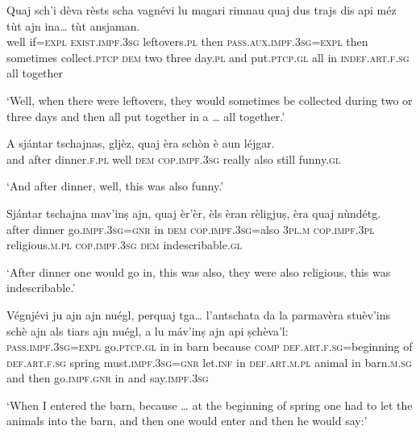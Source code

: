 \begin{linenumbers}
\gll  Quaj sch’i dèva rèsts scha vagnévi lu magari rimnau quaj dus trajs dis api méz tùt ajn ina… tùt ansjaman.  \\
well if=\textsc{expl} \textsc{exist.impf.3sg} leftovers.\textsc{pl} then \textsc{pass.aux.impf.3sg=expl} then sometimes   collect.\textsc{ptcp} \textsc{dem} two three day.\textsc{pl} and put.\textsc{ptcp.gl} all in  \textsc{indef.art.f.sg} all together  \\
\end{linenumbers} 
\medskip
\glt `Well, when there were leftovers, they would sometimes be collected during two or three days and then all put together in a … all together.'
\medskip

\begin{linenumbers}
\gll A sjántar tschajnas, gljèz, quaj èra schòn è aun léjgar.   \\
and after dinner.\textsc{f.pl} well  \textsc{dem} \textsc{cop.impf.3sg} really also still funny.\textsc{gl}  \\
\end{linenumbers}
\medskip
\glt `And after dinner, well, this was also funny.'
\medskip

\begin{linenumbers}
\gll  Sjántar tschajna mav’inṣ ajn, quaj èr’èr, èls èran rèligjuṣ, èra quaj nùndétg.  \\
after dinner go.\textsc{impf.3sg=gnr} in \textsc{dem} \textsc{cop.impf.3sg=}also \textsc{3pl.m} \textsc{cop.impf.3pl} religious.\textsc{m.pl} \textsc{cop.impf.3sg} \textsc{dem} indescribable.\textsc{gl}  \\
\end{linenumbers}
\medskip
\glt `After dinner one would go in, this was also, they were also religious, this was indescribable.'
\medskip

\begin{linenumbers}
\gll  Végnjévi ju ajn ajn nuégl, perquaj tga… l’antschata da la parmavèra stuèv’ins schè ajn als tiars ajn nuégl, a lu máv’inṣ ajn api ṣchèva'l:   \\
 \textsc{pass.impf.3sg=expl} go.\textsc{ptcp.gl} in in barn because \textsc{comp} \textsc{def.art.f.sg}=beginning of \textsc{def.art.f.sg} spring must.\textsc{impf.3sg=gnr} let.\textsc{inf} in \textsc{def.art.m.pl}  animal in barn.\textsc{m.sg} and then  go.\textsc{impf.gnr} in and say.\textsc{impf.3sg}\\
\end{linenumbers}
\medskip
\glt `When I entered the barn, because … at the beginning of spring one had to let the animals into the barn, and then one would enter and then he would say:'
\medskip

